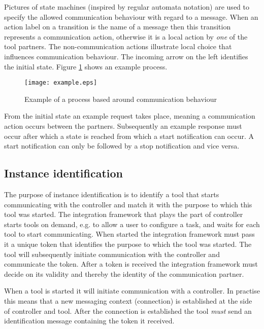 \documentclass{article}
\begin{document}
   \noindent Pictures of state machines (inspired by regular automata notation)
   are used to specify the allowed communication behaviour with regard to a
   message. When an action label on a transition is the name of a message then
   this transition represents a communication action, otherwise it is a local
   action by \emph{one} of the tool partners. The non-communication actions
   illustrate local choice that influences communication behaviour. The
   incoming arrow on the left identifies the initial state. Figure
   \ref{fig:process_example} shows an example process.

   \begin{figure}[H]
    \begin{center}
     \texttt{[image: example.eps]}
    \end{center}
    \vspace{-0.3cm}
    \caption{Example of a process based around communication behaviour}
    \label{fig:process_example}
   \end{figure}

   From the initial state an example request takes place, meaning a
   communication action occurs between the partners. Subsequently an example
   response must occur after which a state is reached from which a start
   notification can occur. A start notification can only be followed by a stop
   notification and vice versa. 

  \subsection{Instance identification} \label{s:instance_identification}

   The purpose of instance identification is to identify a tool that starts
   communicating with the controller and match it with the purpose to which
   this tool was started. The integration framework that plays the part of
   controller starts tools on demand, e.g. to allow a user to configure a task,
   and waits for each tool to start communicating. When started the integration
   framework must pass it a unique token that identifies the purpose to which
   the tool was started.  The tool will subsequently initiate communication
   with the controller and communicate the token. After a token is received the
   integration framework must decide on its validity and thereby the identity
   of the communication partner.   

   When a tool is started it will initiate communication with a controller.  In
   practise this means that a new messaging context (connection) is established
   at the side of controller and tool.  After the connection is established the
   tool \emph{must} send an identification message containing the token it
   received.
   
\end{document}
